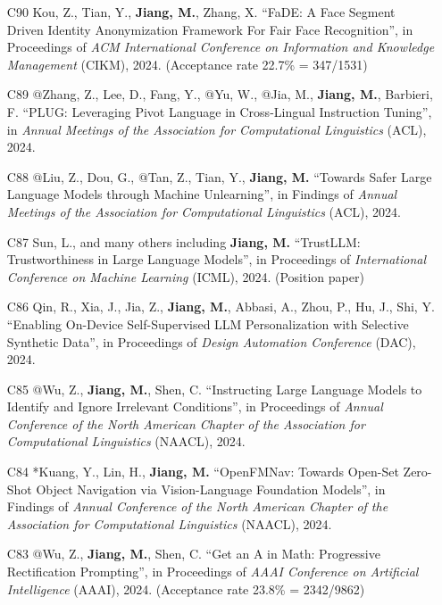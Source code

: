 \documentclass[10pt]{article}
\newenvironment{myindentpar}[1]%
{\begin{list}{}%
         {\setlength{\leftmargin}{#1}}%
         \item[]%
}
{\end{list}}
\newcounter{list}
\begin{document}
\begin{myindentpar}{0.00cm}
\begin{enumerate}[leftmargin=.5cm]
\item[C90] Kou, Z., Tian, Y., \textbf{Jiang, M.}, Zhang, X. ``FaDE: A Face Segment Driven Identity Anonymization Framework For Fair Face Recognition'', in Proceedings of \textit{ACM International Conference on Information and Knowledge Management} (CIKM), 2024. (Acceptance rate 22.7\% = 347/1531)

\item[C89] @Zhang, Z., Lee, D., Fang, Y., @Yu, W., @Jia, M., \textbf{Jiang, M.}, Barbieri, F. ``PLUG: Leveraging Pivot Language in Cross-Lingual Instruction Tuning'', in \textit{Annual Meetings of the Association for Computational Linguistics} (ACL), 2024.

\item[C88] @Liu, Z., Dou, G., @Tan, Z., Tian, Y., \textbf{Jiang, M.} ``Towards Safer Large Language Models through Machine Unlearning'', in Findings of \textit{Annual Meetings of the Association for Computational Linguistics} (ACL), 2024.

\item[C87] Sun, L., and many others including \textbf{Jiang, M.} ``TrustLLM: Trustworthiness in Large Language Models'', in Proceedings of \textit{International Conference on Machine Learning} (ICML), 2024. (Position paper)
		
\item[C86] Qin, R., Xia, J., Jia, Z., \textbf{Jiang, M.}, Abbasi, A., Zhou, P., Hu, J., Shi, Y. ``Enabling On-Device Self-Supervised LLM Personalization with Selective Synthetic Data'', in Proceedings of \textit{Design Automation Conference} (DAC), 2024.

\item[C85] @Wu, Z., \textbf{Jiang, M.}, Shen, C. ``Instructing Large Language Models to Identify and Ignore Irrelevant Conditions'', in Proceedings of \textit{Annual Conference of the North American Chapter of the Association for Computational Linguistics} (NAACL), 2024.

\item[C84] *Kuang, Y., Lin, H., \textbf{Jiang, M.} ``OpenFMNav: Towards Open-Set Zero-Shot Object Navigation via Vision-Language Foundation Models'', in Findings of \textit{Annual Conference of the North American Chapter of the Association for Computational Linguistics} (NAACL), 2024.

\item[C83] @Wu, Z., \textbf{Jiang, M.}, Shen, C. ``Get an A in Math: Progressive Rectification Prompting'', in Proceedings of \textit{AAAI Conference on Artificial Intelligence} (AAAI), 2024. (Acceptance rate 23.8\% = 2342/9862)
		

\end{enumerate}
\end{myindentpar}
\end{document}
